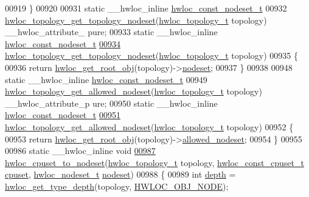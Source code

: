\begin{DoxyCode}
00919 \}
00920 
00931 \textcolor{keyword}{static} \_\_hwloc\_inline \hyperlink{a00040_ga2f5276235841ad66a79bedad16a5a10c}{hwloc_const_nodeset_t}
00932 \hyperlink{a00061_ga78f80a3c04718ca273791a1071512031}{hwloc_topology_get_topology_nodeset}(\hyperlink{a00039_ga9d1e76ee15a7dee158b786c30b6a6e38}{hwloc_topology_t} topology) \_\_hwloc\_attribute\_
      pure;
00933 \textcolor{keyword}{static} \_\_hwloc\_inline \hyperlink{a00040_ga2f5276235841ad66a79bedad16a5a10c}{hwloc_const_nodeset_t}
\hypertarget{a00031_source_l00934}{}\hyperlink{a00061_ga78f80a3c04718ca273791a1071512031}{00934} \hyperlink{a00061_ga78f80a3c04718ca273791a1071512031}{hwloc_topology_get_topology_nodeset}(\hyperlink{a00039_ga9d1e76ee15a7dee158b786c30b6a6e38}{hwloc_topology_t} topology)
00935 \{
00936   \textcolor{keywordflow}{return} \hyperlink{a00053_gadbf58f6e187efbdb3cd9a8e30311b7d7}{hwloc_get_root_obj}(topology)->\hyperlink{a00016_a08f0d0e16c619a6e653526cbee4ffea3}{nodeset};
00937 \}
00938 
00948 \textcolor{keyword}{static} \_\_hwloc\_inline \hyperlink{a00040_ga2f5276235841ad66a79bedad16a5a10c}{hwloc_const_nodeset_t}
00949 \hyperlink{a00061_ga13915b8e074f59fbdf8f973739509293}{hwloc_topology_get_allowed_nodeset}(\hyperlink{a00039_ga9d1e76ee15a7dee158b786c30b6a6e38}{hwloc_topology_t} topology) \_\_hwloc\_attribute\_p
      ure;
00950 \textcolor{keyword}{static} \_\_hwloc\_inline \hyperlink{a00040_ga2f5276235841ad66a79bedad16a5a10c}{hwloc_const_nodeset_t}
\hypertarget{a00031_source_l00951}{}\hyperlink{a00061_ga13915b8e074f59fbdf8f973739509293}{00951} \hyperlink{a00061_ga13915b8e074f59fbdf8f973739509293}{hwloc_topology_get_allowed_nodeset}(\hyperlink{a00039_ga9d1e76ee15a7dee158b786c30b6a6e38}{hwloc_topology_t} topology)
00952 \{
00953   \textcolor{keywordflow}{return} \hyperlink{a00053_gadbf58f6e187efbdb3cd9a8e30311b7d7}{hwloc_get_root_obj}(topology)->\hyperlink{a00016_a19e3d0a5951a7510fc4fc4722a9bf531}{allowed_nodeset};
00954 \}
00955 
00986 \textcolor{keyword}{static} \_\_hwloc\_inline \textcolor{keywordtype}{void}
\hypertarget{a00031_source_l00987}{}\hyperlink{a00062_ga60ecc4ae480c28b5fbd34aca4fc37daa}{00987} \hyperlink{a00062_ga60ecc4ae480c28b5fbd34aca4fc37daa}{hwloc_cpuset_to_nodeset}(\hyperlink{a00039_ga9d1e76ee15a7dee158b786c30b6a6e38}{hwloc_topology_t} topology, \hyperlink{a00040_ga1f784433e9b606261f62d1134f6a3b25}{hwloc_const_cpuset_t} \hyperlink{a00016_a67925e0f2c47f50408fbdb9bddd0790f}{cpuset}, 
      \hyperlink{a00040_ga37e35730fa7e775b5bb0afe893d6d508}{hwloc_nodeset_t} \hyperlink{a00016_a08f0d0e16c619a6e653526cbee4ffea3}{nodeset})
00988 \{
00989         \textcolor{keywordtype}{int} \hyperlink{a00016_a9d82690370275d42d652eccdea5d3ee5}{depth} = \hyperlink{a00046_gaea7c64dd59467f5201ba87712710b14d}{hwloc_get_type_depth}(topology, \hyperlink{a00041_ggacd37bb612667dc437d66bfb175a8dc55aaf0964881117bdedf1a5e9332cd120dd}{HWLOC_OBJ_NODE});

\end{DoxyCode}
